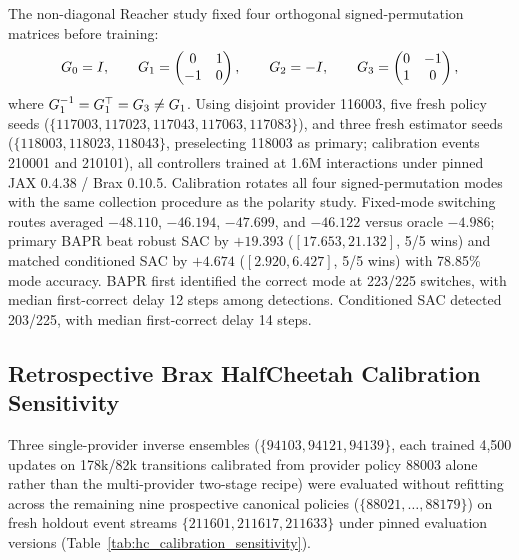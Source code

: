 The non-diagonal Reacher study fixed four orthogonal signed-permutation matrices before training:
\begin{equation}
 G_0=I,\qquad
 G_1=\begin{pmatrix}0&1\\-1&0\end{pmatrix},\qquad
 G_2=-I,\qquad
 G_3=\begin{pmatrix}0&-1\\1&0\end{pmatrix},
\end{equation}
where $G_1^{-1}=G_1^\top=G_3\ne G_1$. Using disjoint provider 116003, five fresh policy seeds ($\{117003,117023,117043,117063,117083\}$), and three fresh estimator seeds ($\{118003,118023,118043\}$, preselecting 118003 as primary; calibration events 210001 and 210101), all controllers trained at 1.6M interactions under pinned JAX 0.4.38 / Brax 0.10.5. Calibration rotates all four signed-permutation modes with the same collection procedure as the polarity study. Fixed-mode switching routes averaged $-48.110$, $-46.194$, $-47.699$, and $-46.122$ versus oracle $-4.986$; primary BAPR beat robust SAC by $+19.393$ ($[17.653,21.132]$, 5/5 wins) and matched conditioned SAC by $+4.674$ ($[2.920,6.427]$, 5/5 wins) with 78.85\% mode accuracy. BAPR first identified the correct mode at 223/225 switches, with median first-correct delay 12 steps among detections. Conditioned SAC detected 203/225, with median first-correct delay 14 steps.

\subsection{Retrospective Brax HalfCheetah Calibration Sensitivity}
\label{app:hc_calibration_sensitivity}

Three single-provider inverse ensembles ($\{94103,94121,94139\}$, each trained 4,500 updates on 178k/82k transitions calibrated from provider policy 88003 alone rather than the multi-provider two-stage recipe) were evaluated without refitting across the remaining nine prospective canonical policies ($\{88021,\ldots,88179\}$) on fresh holdout event streams $\{211601,211617,211633\}$ under pinned evaluation versions (Table~\ref{tab:hc_calibration_sensitivity}).

